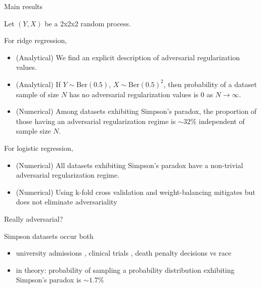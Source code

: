 \begin{frame}{Main results}

  Let $(Y, X)$ be a 2x2x2 random process.\newline

  For ridge regression,
  \begin{itemize}
    \item (Analytical) We find an explicit description of adversarial regularization values.
    \item (Analytical) If $Y \sim \mathrm{Ber}(0.5)$, $X \sim \mathrm{Ber}(0.5)^2$, then probability of a dataset sample of size $N$ has no adversarial regularization values is 0 as $N \rightarrow \infty$.
    \item (Numerical) Among datasets exhibiting Simpson's paradox, the proportion of those having an adversarial regularization regime is $\sim 32\%$ independent of sample size $N$.
  \end{itemize}

For logistic regression,
\begin{itemize}
  \item (Numerical) All datasets exhibiting Simpson's paradox have a non-trivial adversarial regularization regime.
  \item (Numerical) Using k-fold cross validation and weight-balancing mitigates but does not eliminate adversariality
\end{itemize}

\end{frame}

\begin{frame}{Really adversarial?}

Simpson datasets occur both
\begin{itemize}
  \item university admissions \cite{Bickel398}, clinical trials \cite{ABRAMSON19921480}, death penalty decisions vs race \cite{radelet1981racial}
  \item in theory: probability of sampling a probability distribution exhibiting Simpson's paradox is $\sim 1.7\%$ \cite{hadjicostas1998asymptotic}
\end{itemize}


\end{frame}


